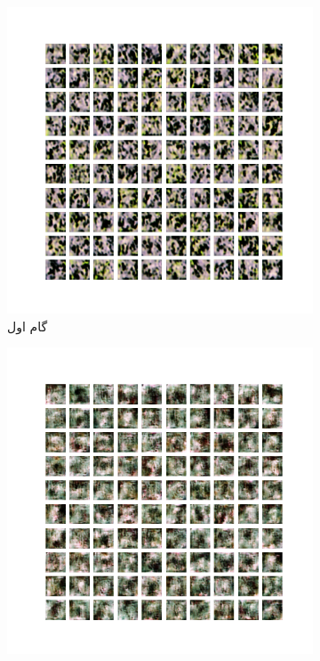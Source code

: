 \documentclass[12pt, a4paper]{book}
\begin{document}
\begin{figure}[h]
    \begin{subfigure}{0.3\linewidth}
        \includegraphics[width=\linewidth]{images/dcgan/nlayer1/generated_img_01.png}
        \caption{گام اول}
    \end{subfigure}
    \begin{subfigure}{0.3\linewidth}
        \includegraphics[width=\linewidth]{images/dcgan/nlayer1/generated_img_15.png}

\end{subfigure}
\end{figure}
\end{document}
